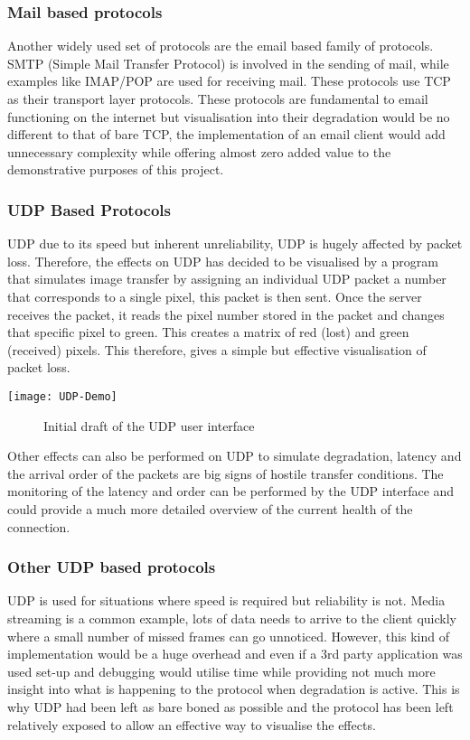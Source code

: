 \subsubsection*{Mail based protocols}
Another widely used set of protocols are the email based family of protocols. SMTP (Simple Mail Transfer Protocol) is involved in the sending of mail, while examples like IMAP/POP are used for receiving mail. These protocols use TCP as their transport layer protocols. These protocols are fundamental to email functioning on the internet but visualisation into their degradation would be no different to that of bare TCP, the implementation of an email client would add unnecessary complexity while offering almost zero added value to the demonstrative purposes of this project.


\subsubsection{UDP Based Protocols}
UDP due to its speed but inherent unreliability, UDP is hugely affected by packet loss. Therefore, the effects on UDP has decided to be visualised by a program that simulates image transfer by assigning an individual UDP packet a number that corresponds to a single pixel, this packet is then sent. Once the server receives the packet, it reads the pixel number stored in the packet and changes that specific pixel to green. This creates a matrix of red (lost) and green (received) pixels. This therefore, gives a simple but effective visualisation of packet loss. 

\begin{center}
\texttt{[image: UDP-Demo]}
	\begin{figure}[h]
		\caption{Initial draft of the UDP user interface}
	\end{figure}
\end{center}

Other effects can also be performed on UDP to simulate degradation, latency and the arrival order of the packets are big signs of hostile transfer conditions. The monitoring of the latency and order can be performed by the UDP interface and could provide a much more detailed overview of the current health of the connection.

\subsubsection*{Other UDP based protocols}
UDP is used for situations where speed is required but reliability is not. Media streaming is a common example, lots of data needs to arrive to the client quickly where a small number of missed frames can go unnoticed. However, this kind of implementation would be a huge overhead and even if a 3rd party application was used set-up and debugging would utilise time while providing not much more insight into what is happening to the protocol when degradation is active. This is why UDP had been left as bare boned as possible and the protocol has been left relatively exposed to allow an effective way to visualise the effects.

